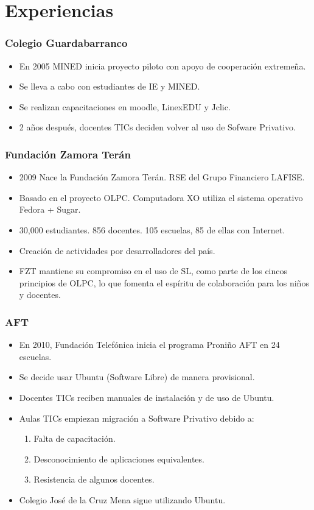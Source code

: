 \documentclass{beamer}
\begin{document}
\section{Experiencias}

\begin{frame}
\frametitle{Colegio Guardabarranco}
	\begin{itemize}
		\pause \item En 2005 MINED inicia proyecto piloto con apoyo de cooperaci\'on extreme\~na.
		\pause \item Se lleva a cabo con estudiantes de IE y MINED.
		\pause \item Se realizan capacitaciones en moodle, LinexEDU y Jclic.
		\pause \item 2 a\~nos despu\'es, docentes TICs deciden volver al uso de Sofware Privativo.
	\end{itemize}
\end{frame}

\begin{frame}
\frametitle{Fundaci\'on Zamora Ter\'an}
	\begin{itemize}
		\pause \item 2009 Nace la Fundaci\'on Zamora Ter\'an. RSE del Grupo Financiero LAFISE.
		\pause \item Basado en el proyecto OLPC. Computadora XO utiliza el sistema operativo Fedora + Sugar.
		\pause \item 30,000 estudiantes. 856 docentes. 105 escuelas, 85 de ellas con Internet.
		\pause \item Creaci\'on de actividades por desarrolladores del pa\'is.
		\pause \item FZT mantiene su compromiso en el uso de SL, como parte de los cincos principios de OLPC, lo que fomenta el esp\'iritu de colaboraci\'on para los ni\~nos y docentes.
	\end{itemize}
\end{frame}	

\begin{frame}
\frametitle{AFT}
	\begin{itemize}
		\pause \item En 2010, Fundaci\'on Telef\'onica inicia el programa Proni\~no AFT en 24 escuelas.
		\pause \item Se decide usar Ubuntu (\alert{Software Libre}) de manera provisional.
		\pause \item Docentes TICs reciben manuales de instalaci\'on y de uso de Ubuntu.
		\pause \item Aulas TICs empiezan migraci\'on a Software Privativo debido a:
			\begin{enumerate}
			\pause \item Falta de capacitaci\'on.
			\pause \item Desconocimiento de aplicaciones equivalentes.
			\pause \item Resistencia de algunos docentes.
			\end{enumerate}
		\pause \item Colegio Jos\'e de la Cruz Mena sigue utilizando Ubuntu.
	\end{itemize}
\end{frame}
\end{document}
